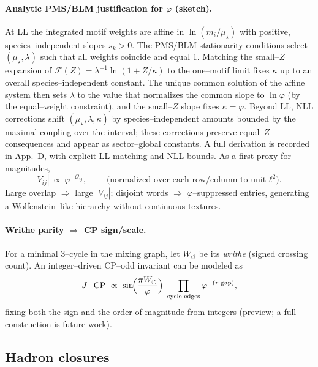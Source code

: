 \documentclass[epjc3]{svjour3}
\begin{document}
\paragraph{Analytic PMS/BLM justification for $\varphi$ (sketch).}
At LL the integrated motif weights are affine in $\ln(m_i/\mu_\star)$ with positive, species–independent slopes $s_k>0$. The PMS/BLM stationarity conditions select $(\mu_\star,\lambda)$ such that all weights coincide and equal 1. Matching the small–$Z$ expansion of $\mathcal F(Z)=\lambda^{-1}\ln(1+Z/\kappa)$ to the one–motif limit fixes $\kappa$ up to an overall species–independent constant. The unique common solution of the affine system then sets $\lambda$ to the value that normalizes the common slope to $\ln\varphi$ (by the equal–weight constraint), and the small–$Z$ slope fixes $\kappa=\varphi$. Beyond LL, NLL corrections shift $(\mu_\star,\lambda,\kappa)$ by species–independent amounts bounded by the maximal coupling over the interval; these corrections preserve equal–$Z$ consequences and appear as sector–global constants. A full derivation is recorded in App.~D, with explicit LL matching and NLL bounds.
As a first proxy for magnitudes,
\begin{equation}
  |V_{ij}|\ \propto\ \varphi^{-\mathcal O_{ij}},
  \qquad\text{(normalized over each row/column to unit $\ell^2$).}
  \label{eq:overlap-hierarchy}
\end{equation}
Large overlap $\Rightarrow$ large $|V_{ij}|$; disjoint words $\Rightarrow$ $\varphi$--suppressed entries, generating a Wolfenstein--like hierarchy without continuous textures.

\paragraph{Writhe parity $\Rightarrow$ CP sign/scale.}
For a minimal 3--cycle in the mixing graph, let $W_{\circlearrowleft}$ be its \emph{writhe} (signed crossing count). An integer--driven CP--odd invariant can be modeled as
\begin{equation}
  J\_{\rm CP}\ \propto\ \sin\!\Bigl(\frac{\pi W_{\circlearrowleft}}{\varphi}\Bigr)\;
  \prod_{\text{cycle edges}}\varphi^{-(r\text{ gap})},
  \label{eq:writhe-jarlskog}
\end{equation}
fixing both the sign and the order of magnitude from integers (preview; a full construction is future work).

\subsection{Hadron closures}
\end{document}
